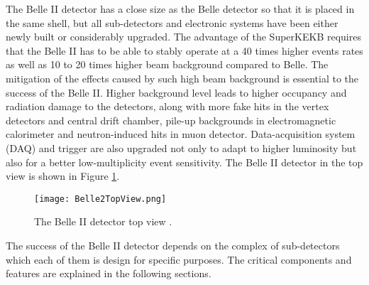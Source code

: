 The Belle II detector has a close size as the Belle detector so that it is placed in the same shell, but all sub-detectors and electronic systems have been either newly built or considerably upgraded. The advantage of the SuperKEKB requires that the Belle II has to be able to stably operate at a 40 times higher events rates as well as 10 to 20 times higher beam background compared to Belle. The mitigation of the effects caused by such high beam background is essential to the success of the Belle II. Higher background level leads to higher occupancy and radiation damage to the detectors, along with more fake hits in the vertex detectors and central drift chamber, pile-up backgrounds in electromagnetic calorimeter and neutron-induced hits in muon detector. Data-acquisition system (DAQ) and trigger are also upgraded not only to adapt to higher luminosity but also for a better low-multiplicity event sensitivity. The Belle II detector in the top view is shown in Figure \ref{fig:belle2_view}.

\begin{comment}
 and expected performances are summarized as follows: 


\textbullet \space vertex resolution of $B$ mesons of $\sim 50 \: \mu\text{m}$,

\textbullet \space excellent reconstruction efficiency for charged tracks down to several 100 MeV and fairly good efficiency for charged tracks down to $\sim$ 50 MeV,

\textbullet \space excellent momentum resolution up to 8 GeV/c,

\textbullet \space highly efficient particle identification to separate $\pi^{\pm}$, $\mu^{\pm}$, $e^{\pm}$, $K^{\pm}$ and $p$ at full energy range of experiment,

\textbullet \space full cover of experimental acceptance solid angle,

\textbullet \space ultra fast and highly efficiency DAQ and trigger system to cope with large data quantities and fast triggering frequency. 
\end{comment}

\begin{figure}[htbp]
	\centering 
	\texttt{[image: Belle2TopView.png]}
	\caption{The Belle II detector top view \cite{b2book}.}
	\label{fig:belle2_view}
\end{figure}

The success of the Belle II detector depends on the complex of sub-detectors which each of them is design for specific purposes. The critical components and features are explained in the following sections. 

